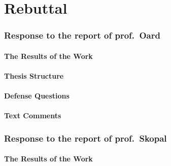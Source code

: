 \part{Rebuttal}
\frame{\vfill\partpage\vfill}

\section{Response to the report of prof.\ Oard}

\subsection{The Results of the Work}
\begin{frame}[fragile]{\secname}
\end{frame}

\subsection{Thesis Structure}
\begin{frame}[fragile]{\secname}
\end{frame}

\subsection{Defense Questions}
\begin{frame}[fragile]{\secname}
\end{frame}

\subsection{Text Comments}
\begin{frame}[fragile]{\secname}
\end{frame}

\section{Response to the report of prof.\ Skopal}

\subsection{The Results of the Work}
\begin{frame}[fragile]{\secname}
\end{frame}


